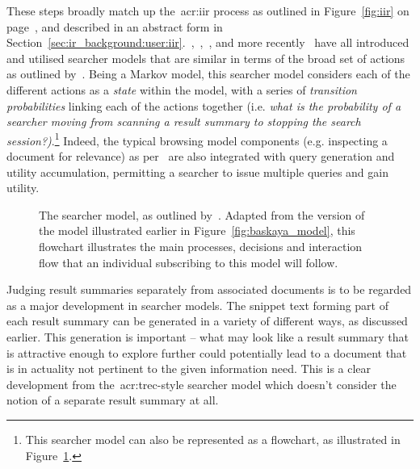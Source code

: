 These steps broadly match up the~\gls{acr:iir} process as outlined in Figure~\ref{fig:iir} on page~\pageref{fig:iir}, and described in an abstract form in Section~\ref{sec:ir_background:user:iir}.~\cite{azzopardi2011economics},~\cite{yilmaz2010browsing_utility},~\cite{carterette2011models}, and more recently~\cite{zhang2017simulation_model} have all introduced and utilised searcher models that are similar in terms of the broad set of actions as outlined by~\cite{baskaya2013behavioural_factors}. Being a Markov model, this searcher model considers each of the different actions as a \emph{state} within the model, with a series of \emph{transition probabilities} linking each of the actions together (i.e. \emph{what is the probability of a searcher moving from scanning a result summary to stopping the search session?)}.\footnote{This searcher model can also be represented as a flowchart, as illustrated in Figure~\ref{fig:baskaya_model_flow}.} Indeed, the typical browsing model components (e.g. inspecting a document for relevance) as per~\cite{carterette2011effectiveness_evaluation} are also integrated with query generation and utility accumulation, permitting a searcher to issue multiple queries and gain utility.

\begin{figure}[t!]
    \centering
    \caption[Flowchart of the search process by~\cite{baskaya2013behavioural_factors}]{The searcher model, as outlined by~\cite{baskaya2013behavioural_factors}. Adapted from the version of the model illustrated earlier in Figure~\ref{fig:baskaya_model}, this flowchart illustrates the main processes, decisions and interaction flow that an individual subscribing to this model will follow.}
    \label{fig:baskaya_model_flow}
\end{figure}

Judging result summaries separately from associated documents is to be regarded as a major development in searcher models. The snippet text forming part of each result summary can be generated in a variety of different ways, as discussed earlier. This generation is important -- what may look like a result summary that is attractive enough to explore further could potentially lead to a document that is in actuality not pertinent to the given information need. This is a clear development from the~\gls{acr:trec}-style searcher model which doesn't consider the notion of a separate result summary at all.

